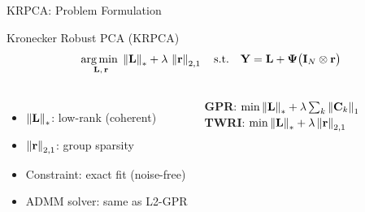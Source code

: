 \begin{frame}{KRPCA: Problem Formulation}

  \begin{shibuiframe}{Kronecker Robust PCA (KRPCA)}
    \[
      \underset{\mathbf{L},\,\mathbf{r}}{\operatorname*{arg\,min}\;}
        \left\| \mathbf{L} \right\|_{*}
        + \lambda\,\left\| \mathbf{r} \right\|_{2,1}
      \quad
      \text{s.t.}
      \quad
      \mathbf{Y} = \mathbf{L} + \boldsymbol{\Psi}\bigl(\mathbf{I}_{N} \otimes \mathbf{r}\bigr)
    \]
  \end{shibuiframe}

  \vspace{0.4em}
  \begin{columns}[T]
      \vspace{0.2em}
      \small
      \begin{itemize}
        \setlength{\itemsep}{0.08em}
        \item $\left\| \mathbf{L} \right\|_{*}$: low-rank (coherent)
        \item $\left\| \mathbf{r} \right\|_{2,1}$: group sparsity
        \item Constraint: exact fit (noise-free)
        \item ADMM solver: same as L2-GPR
      \end{itemize}

      \vspace{0.2em}
      \begin{shibuitip}
        \tiny
        \textbf{GPR}: $\min \left\| \mathbf{L} \right\|_{*} + \lambda\sum_{k}\left\| \mathbf{C}_{k} \right\|_{1}$\\
        \textbf{TWRI}: $\min \left\| \mathbf{L} \right\|_{*} + \lambda\left\| \mathbf{r} \right\|_{2,1}$
      \end{shibuitip}
  \end{columns}
\end{frame}

